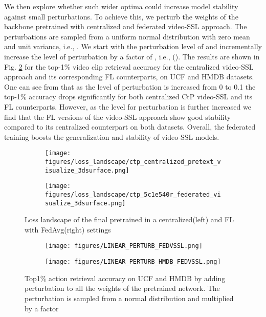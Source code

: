 We then explore whether such wider optima could increase model stability against small perturbations. To achieve this, we perturb the weights of the backbone pretrained with centralized and federated video-SSL approach. The perturbations are sampled from a uniform normal distribution with zero mean and unit variance, i.e., . We start with the perturbation level of  and incrementally increase the level of perturbation by a factor of , i.e., (). 
The results are shown in Fig. \ref{fig:perturb_fed_vs_cent} for the top-1\% video clip retrieval accuracy for the centralized video-SSL approach and its corresponding FL counterparts, on UCF and HMDB datasets. 
One can see from that as the level of perturbation is increased from 0 to 0.1 the top-1\% accuracy drops significantly for both centralized CtP video-SSL and its FL counterparts. However, as the level for perturbation is further increased we find that the FL versions of the video-SSL approach show good stability compared to its centralized counterpart on both datasets. Overall, the federated training boosts the generalization and stability of video-SSL models. 

\begin{figure}[t]
    \centering
    \begin{subfigure}{0.3\textwidth}
    \centering
    \texttt{[image: figures/loss\_landscape/ctp\_centralized\_pretext\_visualize\_3dsurface.png]}
\end{subfigure}\begin{subfigure}{0.3\textwidth}
    \centering
    \texttt{[image: figures/loss\_landscape/ctp\_5c1e540r\_federated\_visualize\_3dsurface.png]}
\end{subfigure}

    \caption{\small Loss landscape of the final  pretrained in a centralized(left) and FL with FedAvg(right) settings}
\label{fig:cent_loss_surf}
\end{figure}

\begin{figure}[pt]
    \centering
    
     \begin{subfigure}{0.5\textwidth}
    \centering
    \texttt{[image: figures/LINEAR\_PERTURB\_FEDVSSL.png]}\\
\end{subfigure}\begin{subfigure}{0.5\textwidth}
    \centering
    \texttt{[image: figures/LINEAR\_PERTURB\_HMDB\_FEDVSSL.png]}
\end{subfigure}
    \caption{\small Top1\% action retrieval accuracy on UCF and HMDB by adding perturbation to all the weights of the pretrained  network. The perturbation is sampled from a normal distribution  and multiplied by a factor }
    \label{fig:perturb_fed_vs_cent}
\end{figure}

